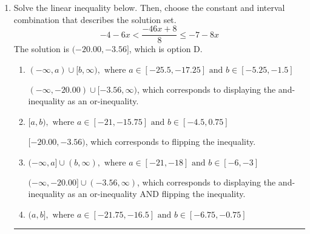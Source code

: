 \documentclass{extbook}[14pt]
\newcommand{\litem}[1]{\item #1

\rule{\textwidth}{0.4pt}}
\begin{document}
\begin{enumerate}
{\begin{enumerate}[label=\Alph*.]
* $[13.0, \infty)$, which is the correct option.
\item \( [a, \infty), \text{ where } a \in [-16, -12] \)

 $[-13.0, \infty)$, which corresponds to negating the endpoint of the solution.
\item \( (-\infty, a], \text{ where } a \in [-15, -12] \)

 $(-\infty, -13.0]$, which corresponds to switching the direction of the interval AND negating the endpoint. You likely did this if you did not flip the inequality when dividing by a negative as well as not moving values over to a side properly.
\item \( (-\infty, a], \text{ where } a \in [6, 15] \)

 $(-\infty, 13.0]$, which corresponds to switching the direction of the interval. You likely did this if you did not flip the inequality when dividing by a negative!
\item \( \text{None of the above}. \)

You may have chosen this if you thought the inequality did not match the ends of the intervals.
\end{enumerate}

\textbf{General Comment:} Remember that less/greater than or equal to includes the endpoint, while less/greater do not. Also, remember that you need to flip the inequality when you multiply or divide by a negative.
}
\litem{
Solve the linear inequality below. Then, choose the constant and interval combination that describes the solution set.
\[ -4 - 6 x < \frac{-46 x + 8}{8} \leq -7 - 8 x \]The solution is \( (-20.00, -3.56] \), which is option D.\begin{enumerate}[label=\Alph*.]
\item \( (-\infty, a) \cup [b, \infty), \text{ where } a \in [-25.5, -17.25] \text{ and } b \in [-5.25, -1.5] \)

$(-\infty, -20.00) \cup [-3.56, \infty)$, which corresponds to displaying the and-inequality as an or-inequality.
\item \( [a, b), \text{ where } a \in [-21, -15.75] \text{ and } b \in [-4.5, 0.75] \)

$[-20.00, -3.56)$, which corresponds to flipping the inequality.
\item \( (-\infty, a] \cup (b, \infty), \text{ where } a \in [-21, -18] \text{ and } b \in [-6, -3] \)

$(-\infty, -20.00] \cup (-3.56, \infty)$, which corresponds to displaying the and-inequality as an or-inequality AND flipping the inequality.
\item \( (a, b], \text{ where } a \in [-21.75, -16.5] \text{ and } b \in [-6.75, -0.75] \)


\end{enumerate}}
\end{enumerate}
\end{document}
